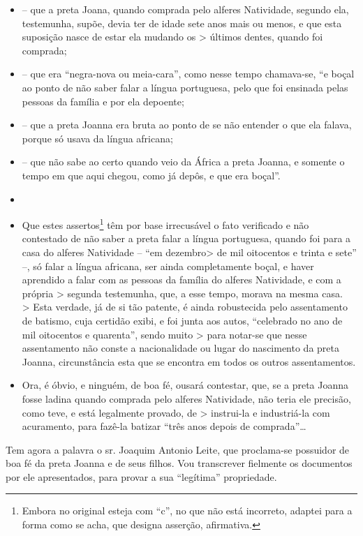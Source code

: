 {\begin{itemize}
\item
  -- que a preta Joana, quando comprada pelo alferes Natividade, segundo
  ela, testemunha, supõe, devia ter de idade sete anos mais ou menos, e
  que esta suposição nasce de estar ela mudando os \textgreater{}
  últimos dentes, quando foi comprada;
\item
  -- que era ``negra-nova ou meia-cara'', como nesse tempo chamava-se, ``e
  boçal ao ponto de não saber falar a língua portuguesa, pelo que foi
  ensinada pelas pessoas da família e por ela depoente;
\item
  -- que a preta Joanna era bruta ao ponto de se não entender o que ela
  falava, porque só usava da língua africana;
\item
  -- que não sabe ao certo quando veio da África a preta Joanna, e
  somente o tempo em que aqui chegou, como já depôs, e que era boçal''.
\item
\item
  Que estes assertos\footnote{ Embora no original esteja com ``c'', no
    que não está incorreto, adaptei para a forma como se acha, que
    designa asserção, afirmativa.} têm por base irrecusável o fato
  verificado e não contestado de não saber a preta falar a língua
  portuguesa, quando foi para a casa do alferes Natividade -- ``em
  dezembro\textgreater{} de mil oitocentos e trinta e sete'' --, só
  falar a língua africana, ser ainda completamente boçal, e haver
  aprendido a falar com as pessoas da família do alferes Natividade, e
  com a própria \textgreater{} segunda testemunha, que, a esse tempo,
  morava na mesma casa.\\
  \textgreater{} Esta verdade, já de si tão patente, é ainda robustecida
  pelo assentamento de batismo, cuja certidão exibi, e foi junta aos
  autos, ``celebrado no ano de mil oitocentos e quarenta'', sendo muito
  \textgreater{} para notar-se que nesse assentamento não conste a
  nacionalidade ou lugar do nascimento da preta Joanna, circunstância
  esta que se encontra em todos os outros assentamentos.
\item
  Ora, é óbvio, e ninguém, de boa fé, ousará contestar, que, se a preta
  Joanna fosse ladina quando comprada pelo alferes Natividade, não teria
  ele precisão, como teve, e está legalmente provado, de \textgreater{}
  instrui-la e industriá-la com acuramento, para fazê-la batizar ``três
  anos depois de comprada''\ldots{}
\end{itemize}

Tem agora a palavra o sr. Joaquim Antonio Leite, que proclama-se
possuidor de boa fé da preta Joanna e de seus filhos. Vou transcrever
fielmente os documentos por ele apresentados, para provar a sua
``legítima'' propriedade.

}

